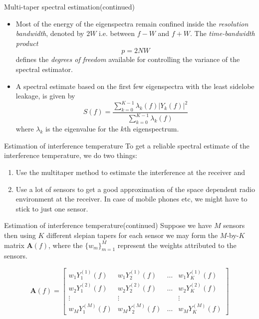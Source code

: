 \documentclass[mathserif]{beamer}
\begin{document}
\begin{frame}{Multi-taper spectral estimation(continued)}

\begin{itemize}

	\item Most of the energy of the eigenspectra remain confined inside the \emph{resolution bandwidth}, denoted by $2W$ i.e. between $f-W$ and $f+W$. The \emph{time-bandwidth product}
\begin{equation*}
    p = 2NW
\end{equation*}
defines the \emph{degrees of freedom} available for controlling the variance of the spectral estimator.

	\item A spectral estimate based on the first few eigenspectra with the least sidelobe leakage, is given by
\begin{equation*}
    \hat{S}(f) = \frac{\sum_{k=0}^{K-1} \lambda_k(f) |Y_k(f)|^2}{\sum_{k=0}^{K-1} \lambda_k(f)}
\end{equation*}
where $\lambda_k$ is the eigenvalue for the $k$th eigenspectrum.

\end{itemize}

\end{frame}




\begin{frame}{Estimation of interference temperature}
To get a reliable spectral estimate of the interference temperature, we do two things:
\begin{enumerate}
    \item Use the multitaper method to estimate the interference at the receiver and
    \item Use a lot of sensors to get a good approximation of the space dependent radio environment at the receiver. In case of mobile phones etc, we might have to stick to just one sensor.
\end{enumerate}

\end{frame}

\begin{frame}{Estimation of interference temperature(continued)}
Suppose we have $M$ sensors then using $K$ different slepian tapers for each sensor we may form the $M$-by-$K$ matrix $\mathbf{A}(f)$, where the $\{w_m\}_{m=1}^M$ represent the weights attributed to the sensors.

\begin{equation*}
    \mathbf{A}(f) = 
    \begin{bmatrix}
        w_1Y_1^{(1)}(f) & w_1Y_2^{(1)}(f) & \ldots & w_1Y_K^{(1)}(f) \\
        w_2Y_1^{(2)}(f) & w_2Y_2^{(2)}(f) & \ldots & w_2Y_K^{(2)}(f) \\
        \vdots & \vdots && \vdots \\
        w_MY_1^{(M)}(f) & w_MY_2^{(M)}(f) & \ldots & w_MY_K^{(M)}(f)
    \end{bmatrix}
\end{equation*}

\end{frame}
\end{document}

